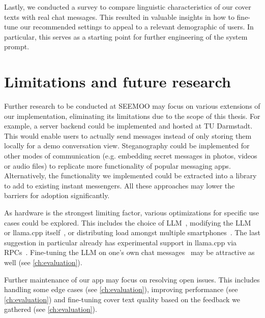 Lastly, we conducted a survey to compare linguistic characteristics of our cover texts with real chat messages. This resulted in valuable insights in how to fine-tune our recommended settings to appeal to a relevant demographic of users. In particular, this serves as a starting point for further engineering of the system prompt.

\section{Limitations and future research}
\label{sec:limitationsAndFutureResearch}
Further research to be conducted at SEEMOO may focus on various extensions of our implementation, eliminating its limitations due to the scope of this thesis. For example, a server backend could be implemented and hosted at TU Darmstadt. This would enable users to actually send messages instead of only storing them locally for a demo conversation view. Steganography could be implemented for other modes of communication (e.g. embedding secret messages in photos, videos or audio files) to replicate more functionality of popular messaging apps. Alternatively, the functionality we implemented could be extracted into a library to add to existing instant messengers. All these approaches may lower the barriers for adoption significantly.

As hardware is the strongest limiting factor, various optimizations for specific use cases could be explored. This includes the choice of \gls{LLM}~\cite{eldanTinyStoriesHowSmall2023}, modifying the \gls{LLM}~\cite{carreiraRevolutionizingMobileInteraction2023} or llama.cpp itself~\cite{chenOptimizationArmv9Architecture2024}, or distributing load amongst multiple smartphones~\cite{zhaoLinguaLinkedDistributedLarge2023}. The last suggestion in particular already has experimental support in llama.cpp via \glspl{RPC}~\cite{gerganovGgerganovLlamacpp2024}. Fine-tuning the \gls{LLM} on one's own chat messages~\cite{donnerSimulationMeFinetuning2024} may be attractive as well (see \cref{ch:evaluation}).

Further maintenance of our app may focus on resolving open issues. This includes handling some edge cases (see \cref{ch:evaluation}), improving performance (see \cref{ch:evaluation}) and fine-tuning cover text quality based on the feedback we gathered (see \cref{ch:evaluation}).
